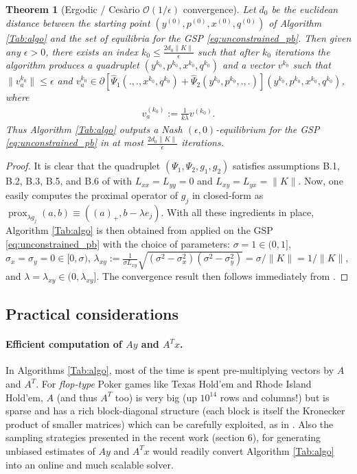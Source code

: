 \documentclass[a4paper,9pt]{extarticle}
\DeclareMathOperator{\prox}{prox}
\newtheorem{theorem}{Theorem}
\begin{document}
\begin{theorem}[Ergodic / Ces\`ario $\mathcal{O}(1/\epsilon)$ convergence]
Let $d_0$ be the euclidean distance between the starting point
$(y^{(0)},p^{(0)},x^{(0)},q^{(0)})$ of Algorithm \ref{Tab:algo} and the
set of equilibria for the GSP \eqref{eq:unconstrained_pb}.
Then given any $\epsilon > 0$, there exists an index
$k_0 \le \frac{2d_0\|K\|}{\epsilon}$ such that after $k_0$ iterations
the algorithm produces a quadruplet
$(y^{k_0},p^{k_0},x^{k_0},q^{k_0})$ and a vector $v^{k_0}$ such that
$\|v_a^{k_0}\| \le \epsilon$ and $v_a^{k_0} \in
\partial[\hat{\Psi}_1(., ., x^{k_0}, q^{k_0}) +
  \hat{\Psi}_2(y^{k_0}, p^{k_0}, ., .)](y^{k_0},p^{k_0},x^{k_0},q^{k_0})$,
where
\begin{eqnarray}
\label{eq:v_a}
v_a^{(k_0)} := \frac{1}{k\lambda}v^{(k_0)}.
\end{eqnarray}
Thus Algorithm \ref{Tab:algo} outputs a Nash
$(\epsilon,0)$-equilibrium for the GSP \eqref{eq:unconstrained_pb}
in at most $\frac{2d_0\|K\|}{\epsilon}$ iterations.
\end{theorem}

\begin{proof}
It is clear that the quadruplet $(\Psi_1, \Psi_2, g_1, g_2)$
satisfies assumptions B.1, B.2, B.3, B.5, and B.6 of
\cite{he2013accelerating} with $L_{xx} = L_{yy} = 0$ and $L_{xy} =
L_{yx} = \|K\|$. Now, one easily computes the proximal operator of
$g_j$ in closed-form as $\prox_{\lambda g_j}(a, b) \equiv ((a)_+,
b - \lambda e_j)$. With all these ingredients in place, Algorithm
\ref{Tab:algo} is then obtained from \cite[Algorithm
  T-BD]{he2013accelerating} applied on the GSP
\eqref{eq:unconstrained_pb} with the choice of parameters: $\sigma = 1
\in (0, 1]$, $\sigma_x = \sigma_y = 0 \in [0, \sigma)$,
    $\lambda_{xy} := \frac{1}{\sigma L_{xy}}\sqrt{(\sigma^2 -
        \sigma_x^2)(\sigma^2 - \sigma_y^2)} = \sigma / \|K\| =
      1/\|K\|$, and $\lambda = \lambda_{xy} \in (0,
      \lambda_{xy}]$. The convergence result then follows immediately
  from \cite[Theorem 4.2]{he2013accelerating}.
\end{proof}

\subsection{Practical considerations}
\paragraph*{Efficient computation of $Ay$ and $A^Tx$.}
In Algorithms \ref{Tab:algo}, most of the time is spent
pre-multiplying vectors by $A$ and $A^T$. For \textit{flop-type} Poker
games like Texas Hold'em and  Rhode Island Hold'em,
$A$ (and thus $A^T$ too)  is very big (up $10^{14}$ rows and columns!)
but is sparse and has a rich block-diagonal structure (each block is
itself the Kronecker product of smaller matrices) which can be
carefully exploited, as in \cite{hoda2010smoothing}. Also the sampling
strategies presented in the recent work \cite{kroer2015} (section 6),
for generating unbiased estimates of $Ay$ and $A^Tx$ would readily
convert Algorithm \ref{Tab:algo} into an online and much scalable
solver.
\end{document}
